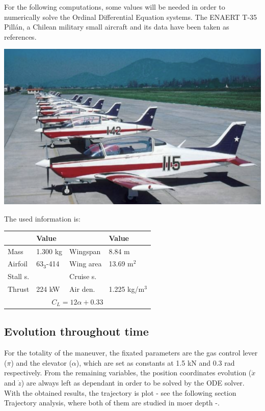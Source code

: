 For the following computations, some values will be needed in order to numerically solve the Ordinal Differential Equation systems. The ENAERT T-35 Pillán, a Chilean military small aircraft and its data \cite{jane1969jane} have been taken as references.\\

\begin{center}
	\includegraphics[width=0.9\linewidth]{figures/pillan}
	\vspace{0.5cm}
	\vspace{0.25cm}
\end{center}

The used information is:

\begin{center}
\begin{tabular}{|l|l||l|l|}\hline
	 & Value &   & Value\\ \hline \hline
	Mass & 1.300 kg& Wingspan & 8.84 m\\ \hline
	Airfoil & 63$_3$-414 & Wing area & 13.69 m$^2$ \\ \hline
	Stall s. & &  Cruise s. &\\ \hline
	Thrust &224 kW & Air den. & 1.225 kg/m$^3$ \\ \hline
	\multicolumn{4}{|c|}{$C_L=12\alpha+0.33$}\\ \hline	
\end{tabular}
\end{center}

\subsection*{Evolution throughout time}
For the totality of the maneuver, the fixated parameters are the gas control lever ($\pi$) and the elevator ($\alpha$), which are set as constants at 1.5 kN and 0.3 rad respectively. From the remaining variables, the position coordinates evolution ($\Dot{x}$ and $\Dot{z}$) are always left as dependant in order to be solved by the ODE solver. With the obtained results, the trajectory is plot - see the following section Trajectory analysis, where both of them are studied in moer depth -.

